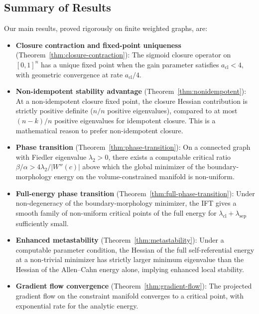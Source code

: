 \documentclass[lettersize,journal]{IEEEtran}
\begin{document}
\subsection{Summary of Results}

Our main results, proved rigorously on finite weighted graphs, are:

\begin{itemize}
\item \textbf{Closure contraction and fixed-point uniqueness} (Theorem~\ref{thm:closure-contraction}): The sigmoid closure operator on $[0,1]^n$ has a unique fixed point when the gain parameter satisfies $a_{\mathrm{cl}} < 4$, with geometric convergence at rate $a_{\mathrm{cl}}/4$.

\item \textbf{Non-idempotent stability advantage} (Theorem~\ref{thm:nonidempotent}): At a non-idempotent closure fixed point, the closure Hessian contribution is strictly positive definite ($n/n$ positive eigenvalues), compared to at most $(n-k)/n$ positive eigenvalues for idempotent closure. This is a mathematical reason to prefer non-idempotent closure.

\item \textbf{Phase transition} (Theorem~\ref{thm:phase-transition}): On a connected graph with Fiedler eigenvalue $\lambda_2 > 0$, there exists a computable critical ratio $\beta/\alpha > 4\lambda_2/|W''(c)|$ above which the global minimizer of the boundary-morphology energy on the volume-constrained manifold is non-uniform.

\item \textbf{Full-energy phase transition} (Theorem~\ref{thm:full-phase-transition}): Under non-degeneracy of the boundary-morphology minimizer, the IFT gives a smooth family of non-uniform critical points of the full energy for $\lambda_{\mathrm{cl}} + \lambda_{\mathrm{sep}}$ sufficiently small.

\item \textbf{Enhanced metastability} (Theorem~\ref{thm:metastability}): Under a computable parameter condition, the Hessian of the full self-referential energy at a non-trivial minimizer has strictly larger minimum eigenvalue than the Hessian of the Allen--Cahn energy alone, implying enhanced local stability.

\item \textbf{Gradient flow convergence} (Theorem~\ref{thm:gradient-flow}): The projected gradient flow on the constraint manifold converges to a critical point, with exponential rate for the analytic energy.


\end{itemize}
\end{document}
